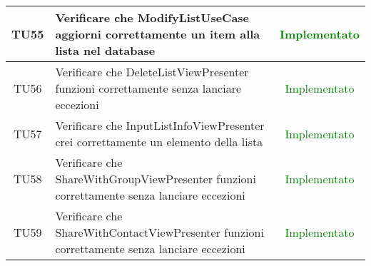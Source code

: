 \begin{center}
\begin{longtable}{|c|>{\centering}m{10cm}|c|}
		TU55 & Verificare che ModifyListUseCase aggiorni correttamente un item alla lista nel database & \textcolor{Green}{Implementato}\\ \hline
		TU56 & Verificare che DeleteListViewPresenter funzioni correttamente senza lanciare eccezioni & \textcolor{Green}{Implementato}\\ \hline
		TU57 & Verificare che InputListInfoViewPresenter crei correttamente un elemento della lista & \textcolor{Green}{Implementato}\\ \hline
		TU58 & Verificare che ShareWithGroupViewPresenter funzioni correttamente senza lanciare eccezioni & \textcolor{Green}{Implementato}\\ \hline
		TU59 & Verificare che ShareWithContactViewPresenter funzioni correttamente senza lanciare eccezioni & \textcolor{Green}{Implementato}\\ \hline
	\end{longtable}
\end{center}
